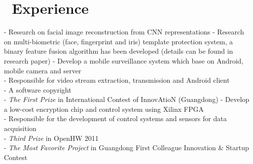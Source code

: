 \documentclass{resume}
\begin{document}
\section{\faUsers\ Experience}
- Research on facial image reconstruction from CNN representations
- Research on multi-biometric (face, fingerprint and iris) template protection system, a binary feature fusion algorithm has been developed (details can be found in research paper) 
- Develop a mobile surveillance system which base on Android, mobile camera and server\\
- Responsible for video stream extraction, transmission and Android client  \\
- A software copyright\\
- \textit{The First Prize} in International Contest of InnovAtioN (Guangdong) 
- Develop a low-cost encryption chip and control system using Xilinx FPGA\\
- Responsible for the development of control systems and sensors for data acquisition\\
- \textit{Third Prize} in OpenHW 2011\\
- \textit{The Most Favorite Project} in Guangdong First Colleague Innovation \& Startup Contest
%
\end{document}
